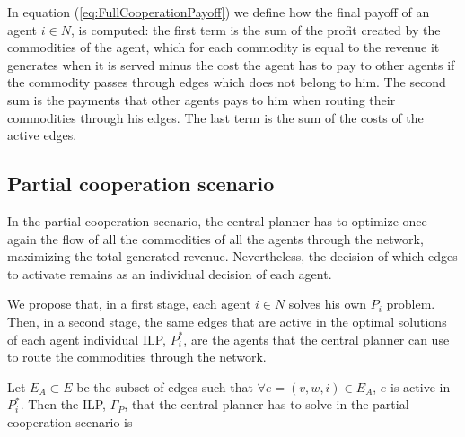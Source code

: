 \documentclass[review]{elsarticle}
\begin{document}
In equation (\ref{eq:FullCooperationPayoff}) we define how the final payoff of an agent $i\in N$, is computed: the first term is the sum of the profit created by the commodities of the agent, which for each commodity is equal to the revenue it
generates when it is served minus the cost the agent has to pay to other agents
if the commodity passes through edges which does not belong to him. The second
sum is the payments that other agents pays to him when routing their commodities
through his edges. The last term is the sum of the costs of the active edges.


\subsection{Partial cooperation scenario}

In the partial cooperation scenario, the central planner has to optimize once
again the flow of all the commodities of all the agents through the network,
maximizing the total generated revenue. Nevertheless, the decision of which
edges to activate remains as an individual decision of each agent.


We propose that, in a first stage, each agent $i \in N$ solves his own $P_i$ problem. Then, in a second stage, the same edges that are active in the optimal solutions of each agent individual ILP, $P_i^*$, are the agents that the central planner can use to route the commodities through the network.

Let $E_A \subset E$ be the subset of edges such that $\forall e=(v,w,i) \in
E_A$, $e$ is active in $P_i^*$. Then the ILP, $\Gamma_P$, that the central
planner has to solve in the partial cooperation scenario is
\end{document}
